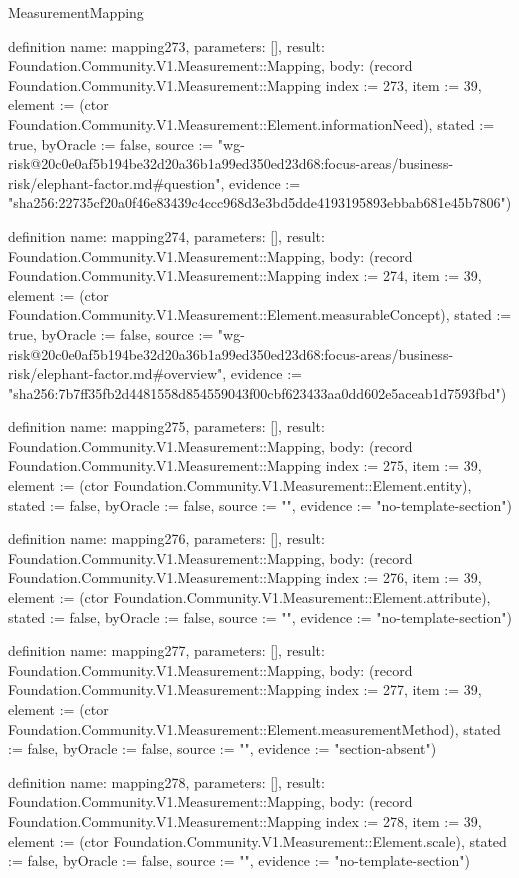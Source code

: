 \begin{lexlean}{MeasurementMapping}
\begin{semanticmodule}
definition{
  name: mapping273,
  parameters: [],
  result: Foundation.Community.V1.Measurement::Mapping,
  body: (record Foundation.Community.V1.Measurement::Mapping {index := 273, item := 39, element := (ctor Foundation.Community.V1.Measurement::Element.informationNeed), stated := true, byOracle := false, source := "wg-risk@20c0e0af5b194be32d20a36b1a99ed350ed23d68:focus-areas/business-risk/elephant-factor.md#question", evidence := "sha256:22735cf20a0f46e83439c4ccc968d3e3bd5dde4193195893ebbab681e45b7806"})
}

definition{
  name: mapping274,
  parameters: [],
  result: Foundation.Community.V1.Measurement::Mapping,
  body: (record Foundation.Community.V1.Measurement::Mapping {index := 274, item := 39, element := (ctor Foundation.Community.V1.Measurement::Element.measurableConcept), stated := true, byOracle := false, source := "wg-risk@20c0e0af5b194be32d20a36b1a99ed350ed23d68:focus-areas/business-risk/elephant-factor.md#overview", evidence := "sha256:7b7ff35fb2d4481558d854559043f00cbf623433aa0dd602e5aceab1d7593fbd"})
}

definition{
  name: mapping275,
  parameters: [],
  result: Foundation.Community.V1.Measurement::Mapping,
  body: (record Foundation.Community.V1.Measurement::Mapping {index := 275, item := 39, element := (ctor Foundation.Community.V1.Measurement::Element.entity), stated := false, byOracle := false, source := "", evidence := "no-template-section"})
}

definition{
  name: mapping276,
  parameters: [],
  result: Foundation.Community.V1.Measurement::Mapping,
  body: (record Foundation.Community.V1.Measurement::Mapping {index := 276, item := 39, element := (ctor Foundation.Community.V1.Measurement::Element.attribute), stated := false, byOracle := false, source := "", evidence := "no-template-section"})
}

definition{
  name: mapping277,
  parameters: [],
  result: Foundation.Community.V1.Measurement::Mapping,
  body: (record Foundation.Community.V1.Measurement::Mapping {index := 277, item := 39, element := (ctor Foundation.Community.V1.Measurement::Element.measurementMethod), stated := false, byOracle := false, source := "", evidence := "section-absent"})
}

definition{
  name: mapping278,
  parameters: [],
  result: Foundation.Community.V1.Measurement::Mapping,
  body: (record Foundation.Community.V1.Measurement::Mapping {index := 278, item := 39, element := (ctor Foundation.Community.V1.Measurement::Element.scale), stated := false, byOracle := false, source := "", evidence := "no-template-section"})
}


\end{semanticmodule}
\end{lexlean}
